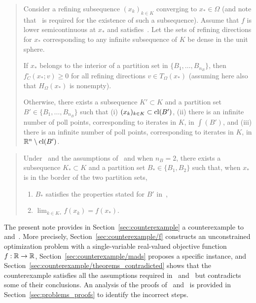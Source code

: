 \begin{quote}\textbf{\cite[Theorem~4.1]{ViCu2012}}
	Consider a refining subsequence $(x_k)_{k \in K}$ converging to $x_* \in \Omega$ (and note that~\cite[Assumption~2.1]{ViCu2012} is required for the existence of such a subsequence).
	Assume that $f$ is lower semicontinuous at $x_*$ and satisfies~\cite[Assumption~4.1]{ViCu2012}.
	Let the sets of refining directions for $x_*$ corresponding to any infinite subsequence of $K$ be dense in the unit sphere.
	
	If $x_*$ belongs to the interior of a partition set in $\{B_1, \dots, B_{n_B}\}$, then $f^\circ_C(x_*;v) \geq 0$ for all refining directions $v \in T_\Omega(x_*)$ (assuming here also that $H_\Omega(x_*)$ is nonempty).
	
	Otherwise, there exists a subsequence $K' \subset K$ and a partition set $B' \in \{B_1, \dots, B_{n_B}\}$ such that (i) $(x_k)_{k \in K} \subset \mathrm{cl}(B')$, (ii) there is an infinite number of poll points, corresponding to iterates in $K$, in $\int(B')$, and (iii) there is an infinite number of poll points, corresponding to iterates in $K$, in $\mathbb{R}^n \setminus \mathrm{cl}(B')$.
\end{quote}

\begin{quote}\textbf{\cite[Corollary~4.1]{ViCu2012}}
	Under~\cite[Assumption~2.1]{ViCu2012} and the assumptions of~\cite[Theorem~4.1]{ViCu2012} and when $n_B = 2$, there exists a subsequence $K_* \subset K$ and a partition set $B_* \in \{B_1, B_2\}$ such that, when $x_*$ is in the border of the two partition sets,
	\begin{enumerate}
		\item $B_*$ satisfies the properties stated for $B'$ in~\cite[Theorem~4.1]{ViCu2012},
		\item $\lim_{k \in K_*} f(x_k) = f(x_*)$.
	\end{enumerate}
\end{quote}

The present note provides in Section~\ref{sec:counterexample} a counterexample to~\cite[Theorem~4.1]{ViCu2012} and~\cite[Corollary~4.1]{ViCu2012}. 
More precisely, Section~\ref{sec:counterexample/f} constructs an unconstrained optimization problem with a single-variable real-valued objective function $f : \mathbb{R} \to \mathbb{R}$, Section~\ref{sec:counterexample/mads} proposes a specific \ddsm instance, and Section~\ref{sec:counterexample/theorems_contradicted} shows that the counterexample satisfies all the assumptions required in~\cite[Theorem~4.1]{ViCu2012} and~\cite[Corollary~4.1]{ViCu2012} but contradicts some of their conclusions.
An analysis of the proofs of~\cite[Theorem~4.1]{ViCu2012} and~\cite[Corollary~4.1]{ViCu2012} is provided in Section~\ref{sec:problems_proofs} to identify the incorrect steps.

